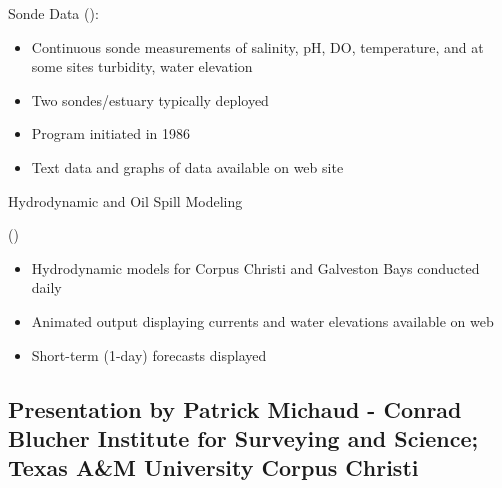 Sonde Data (): 
\begin{itemize}
\item Continuous sonde measurements of salinity, pH, DO, temperature, and at some sites turbidity, 
water elevation
\item Two sondes/estuary typically deployed
\item Program initiated in 1986
\item Text data and graphs of data available on web site
\end{itemize}

Hydrodynamic and Oil Spill Modeling
 
()
\begin{itemize}
\item Hydrodynamic models for Corpus Christi and Galveston Bays conducted daily
\item Animated output displaying currents and water elevations available on web
\item Short-term (1-day) forecasts displayed
\end{itemize}

\subsection{Presentation by Patrick Michaud - Conrad Blucher Institute for Surveying and Science; 
Texas A\&M University Corpus Christi}

